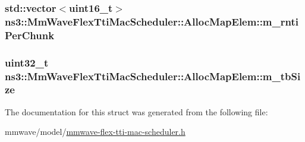 \subsubsection[{\texorpdfstring{m\+\_\+rnti\+Per\+Chunk}{m_rntiPerChunk}}]{\setlength{\rightskip}{0pt plus 5cm}std\+::vector$<$uint16\+\_\+t$>$ ns3\+::\+Mm\+Wave\+Flex\+Tti\+Mac\+Scheduler\+::\+Alloc\+Map\+Elem\+::m\+\_\+rnti\+Per\+Chunk}\hypertarget{structns3_1_1MmWaveFlexTtiMacScheduler_1_1AllocMapElem_adb4db6f52be38d2dcdb167c6bb06d8c6}{}\label{structns3_1_1MmWaveFlexTtiMacScheduler_1_1AllocMapElem_adb4db6f52be38d2dcdb167c6bb06d8c6}
\subsubsection[{\texorpdfstring{m\+\_\+tb\+Size}{m_tbSize}}]{\setlength{\rightskip}{0pt plus 5cm}uint32\+\_\+t ns3\+::\+Mm\+Wave\+Flex\+Tti\+Mac\+Scheduler\+::\+Alloc\+Map\+Elem\+::m\+\_\+tb\+Size}\hypertarget{structns3_1_1MmWaveFlexTtiMacScheduler_1_1AllocMapElem_ae8b9bd04864d7c1e86668e3ada40bcd0}{}\label{structns3_1_1MmWaveFlexTtiMacScheduler_1_1AllocMapElem_ae8b9bd04864d7c1e86668e3ada40bcd0}


The documentation for this struct was generated from the following file\+:\begin{DoxyCompactItemize}
\item 
mmwave/model/\hyperlink{mmwave-flex-tti-mac-scheduler_8h}{mmwave-\/flex-\/tti-\/mac-\/scheduler.\+h}\end{DoxyCompactItemize}
